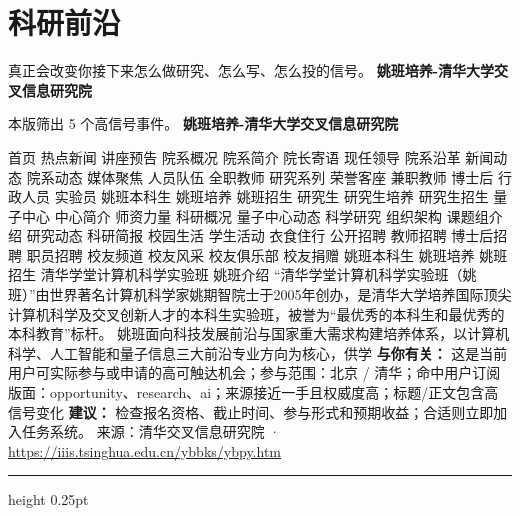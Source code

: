 \documentclass[10.5pt]{ctexart}
\begin{document}
\section*{科研前沿}
{\color{ormuted} 真正会改变你接下来怎么做研究、怎么写、怎么投的信号。}
\vspace{2mm}
{\LARGE\bfseries 姚班培养-清华大学交叉信息研究院}\par
\vspace{1mm}
{\color{ormuted} 本版筛出 5 个高信号事件。}
\vspace{3mm}
{\Large\bfseries 姚班培养-清华大学交叉信息研究院}\par
首页 热点新闻 讲座预告 院系概况 院系简介 院长寄语 现任领导 院系沿革 新闻动态 院系动态 媒体聚焦 人员队伍 全职教师 研究系列 荣誉客座 兼职教师 博士后 行政人员 实验员 姚班本科生 姚班培养 姚班招生 研究生 研究生培养 研究生招生 量子中心 中心简介 师资力量 科研概况 量子中心动态 科学研究 组织架构 课题组介绍 研究动态 科研简报 校园生活 学生活动 衣食住行 公开招聘 教师招聘 博士后招聘 职员招聘 校友频道 校友风采 校友俱乐部 校友捐赠 姚班本科生 姚班培养 姚班招生 清华学堂计算机科学实验班 姚班介绍 “清华学堂计算机科学实验班（姚班）”由世界著名计算机科学家姚期智院士于2005年创办，是清华大学培养国际顶尖计算机科学及交叉创新人才的本科生实验班，被誉为“最优秀的本科生和最优秀的本科教育”标杆。 姚班面向科技发展前沿与国家重大需求构建培养体系，以计算机科学、人工智能和量子信息三大前沿专业方向为核心，供学
\textbf{与你有关：} 这是当前用户可实际参与或申请的高可触达机会；参与范围：北京 / 清华；命中用户订阅版面：opportunity、research、ai；来源接近一手且权威度高；标题/正文包含高信号变化
\textbf{建议：} 检查报名资格、截止时间、参与形式和预期收益；合适则立即加入任务系统。
{\footnotesize\color{ormuted} 来源：清华交叉信息研究院 · \url{https://iiis.tsinghua.edu.cn/ybbks/ybpy.htm}}
\vspace{4mm}
\hrule height 0.25pt
\vspace{3mm}
\end{document}
